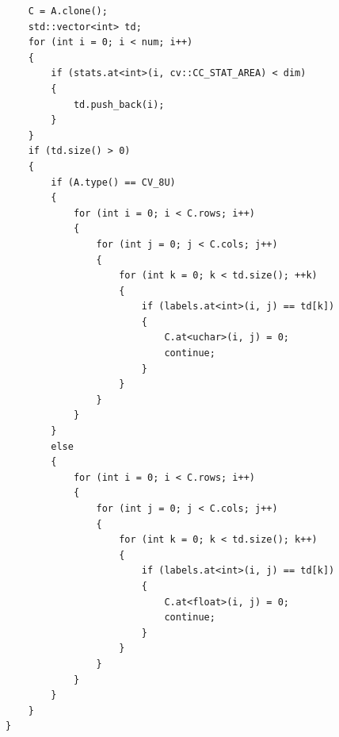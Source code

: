 \begin{lstlisting}
    C = A.clone();
    std::vector<int> td;
    for (int i = 0; i < num; i++)
    {
        if (stats.at<int>(i, cv::CC_STAT_AREA) < dim)
        {
            td.push_back(i);
        }
    }
    if (td.size() > 0)
    {
        if (A.type() == CV_8U)
        {
            for (int i = 0; i < C.rows; i++)
            {
                for (int j = 0; j < C.cols; j++)
                {
                    for (int k = 0; k < td.size(); ++k)
                    {
                        if (labels.at<int>(i, j) == td[k])
                        {
                            C.at<uchar>(i, j) = 0;
                            continue;
                        }
                    }
                }
            }
        }
        else
        {
            for (int i = 0; i < C.rows; i++)
            {
                for (int j = 0; j < C.cols; j++)
                {
                    for (int k = 0; k < td.size(); k++)
                    {
                        if (labels.at<int>(i, j) == td[k])
                        {
                            C.at<float>(i, j) = 0;
                            continue;
                        }
                    }
                }
            }
        }
    }
}

\end{lstlisting}


